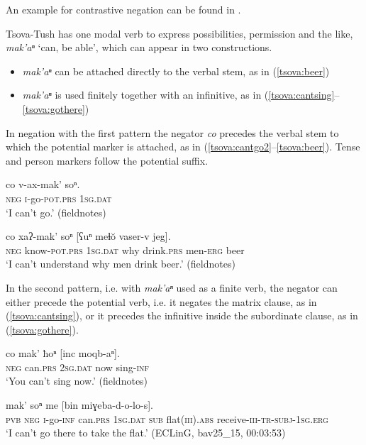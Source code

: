 \documentclass[output=paper,%
colorlinks,citecolor=brown,
showindex
]{langscibook}
\begin{document}
An example for contrastive negation can be found in .

Tsova-Tush has one modal verb to express possibilities, permission and the like, \textit{mak'aⁿ} `can, be able', which can appear in two constructions.

\begin{itemize}
	\item \textit{mak’aⁿ}  can be attached directly to the verbal stem, as in (\ref{tsova:beer})
	\item \textit{mak’aⁿ } is used finitely together with an infinitive, as in (\ref{tsova:cantsing}--\ref{tsova:gothere})
\end{itemize}

In negation with the first pattern the negator \textit{co} precedes the verbal stem to which the potential marker is attached, as in (\ref{tsova:cantgo2}--\ref{tsova:beer}). Tense and person markers follow the potential suffix.

\ea	\label{tsova:cantgo2}
\gll 	co	v-ax-mak’	soⁿ.	\\  
	\textsc{neg} \textsc{i}-go-\textsc{pot.prs} \textsc{1sg.dat}\\
\glt `I can’t go.' (fieldnotes)
\z

\ea	\label{tsova:beer}
\gll 	co	xaʔ-mak’	soⁿ	[ʕuⁿ	meɬŏ	vaser-v	jeg].\\  
	\textsc{neg} know-\textsc{pot.prs} \textsc{1sg.dat} why drink.\textsc{prs} men-\textsc{erg} beer\\
\glt `I can’t understand why men drink beer.' (fieldnotes)
\z

In the second pattern, i.e. with \textit{mak’aⁿ } used as a finite verb, the negator can either precede the potential verb, i.e. it negates the matrix clause, as in (\ref{tsova:cantsing}), or it precedes the infinitive inside the subordinate clause, as in (\ref{tsova:gothere}).

\ea	\label{tsova:cantsing}
\gll 	co	mak’	ħoⁿ	[inc	moqb-aⁿ].\\  
	\textsc{neg} can.\textsc{prs} \textsc{2sg.dat} now sing-\textsc{inf}\\
\glt `You can’t sing now.' (fieldnotes)
\z

\ea	\label{tsova:gothere}
\gll 	[ču	co 	v-ax-aⁿ]	mak’	soⁿ me [bin  miɣeba-d-o-lo-s].\\  
	\textsc{pvb} \textsc{neg} \textsc{i}-go-\textsc{inf} can.\textsc{prs} \textsc{1sg.dat} \textsc{sub} flat(\textsc{iii}).\textsc{abs} receive-\textsc{iii}-\textsc{tr}-\textsc{subj}-\textsc{1sg.erg}\\
\glt `I can’t go there to take the flat.' (ECLinG, bav25\_15, 00:03:53)
\z
\end{document}
